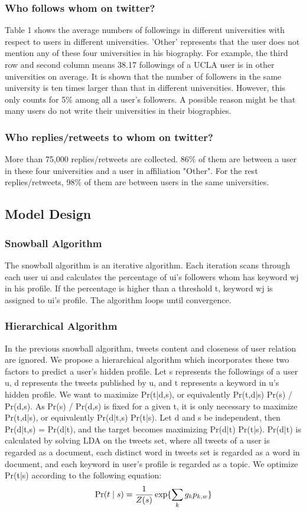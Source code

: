 \subsubsection{Who follows whom on twitter?}
Table 1 shows the average numbers of followings in different universities with respect to users in different universities. 'Other' represents that the user does not mention any of these four universities in his biography. For example, the third row and second column means 38.17 followings of a UCLA user is in other universities on average. It is shown that the number of followers in the same university is ten times larger than that in different universities. However, this only counts for 5\% among all a user's followers. A possible reason might be that many users do not write their universities in their biographies.

\subsubsection{Who replies/retweets to whom on twitter?}
More than 75,000 replies/retweets are collected. 86\% of them are between a user in these four universities and a user in affiliation "Other". For the rest replies/retweets, 98\% of them are between users in the same universities.

\subsection{Model Design}
\subsubsection{Snowball Algorithm}
The snowball algorithm is an iterative algorithm. Each iteration scans through each user ui and calculates the percentage of ui's followers whom has keyword wj in his profile. If the percentage is higher than a threshold t, keyword wj is assigned to ui's profile. The algorithm loops until convergence.
\subsubsection{Hierarchical Algorithm}
In the previous snowball algorithm, tweets content and closeness of user relation are ignored. We propose a hierarchical algorithm which incorporates these two factors to predict a user's hidden profile.
Let s represents the followings of a user u, d represents the tweets published by u, and t represents a keyword in u's hidden profile. We want to maximize Pr(t|d,s), or equivalently Pr(t,d|s) Pr(s) / Pr(d,s). As Pr(s) / Pr(d,s) is fixed for a given t, it is only necessary to maximize Pr(t,d|s), or equivalently Pr(d|t,s) Pr(t|s). Let d and s be independent, then Pr(d|t,s) = Pr(d|t), and the target becomes maximizing Pr(d|t) Pr(t|s).
Pr(d|t) is calculated by solving LDA on the tweets set, where all tweets of a user is regarded as a document, each distinct word in tweets set is regarded as a word in document, and each keyword in user's profile is regarded as a topic. We optimize Pr(t|s) according to the following equation:
\begin{equation}
\mbox{Pr}(t \mid s) = {1 \over Z(s)} \exp\{\sum_k g_k p_{k,w}\}
\end{equation}

